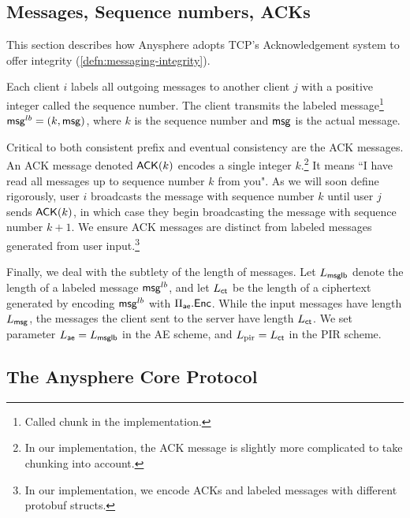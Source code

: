 \subsection{Messages, Sequence numbers, ACKs}
\label{subsec:ACK}
This section describes how Anysphere adopts TCP's Acknowledgement system to offer integrity (\cref{defn:messaging-integrity}).

Each client $i$ labels all outgoing messages to another client $j$ with a positive integer called the sequence number. The client transmits the labeled message\footnote{Called chunk in the implementation.} $\mathsf{msg}^{lb} = (k, \mathsf{msg})$, where $k$ is the sequence number and $\mathsf{msg}$ is the actual message. 

Critical to both consistent prefix and eventual consistency are the ACK messages. An ACK message denoted $\mathsf{ACK}(k)$ encodes a single integer $k$.\footnote{In our implementation, the ACK message is slightly more complicated to take chunking into account.} It means ``I have read all messages up to sequence number $k$ from you". As we will soon define rigorously, user $i$ broadcasts the message with sequence number $k$ until user $j$ sends $\mathsf{ACK}(k)$, in which case they begin broadcasting the message with sequence number $k + 1$. We ensure ACK messages are distinct from labeled messages generated from user input.\footnote{In our implementation, we encode ACKs and labeled messages with different protobuf structs.}

Finally, we deal with the subtlety of the length of messages. Let $L_{\mathsf{msglb}}$ denote the length of a labeled message $\mathsf{msg}^{lb}$, and let $L_{\mathsf{ct}}$ be the length of a ciphertext generated by encoding $\mathsf{msg}^{lb}$ with $\Pi_{\mathsf{ae}}.\mathsf{Enc}$. While the input messages have length $L_{\mathsf{msg}}$, the messages the client sent to the server have length $L_{\mathsf{ct}}$. We set parameter $L_{\mathsf{ae}} = L_{\mathsf{msglb}}$ in the AE scheme, and $L_{\text{pir}} = L_{\mathsf{ct}}$ in the PIR scheme.

\subsection{The Anysphere Core Protocol}

